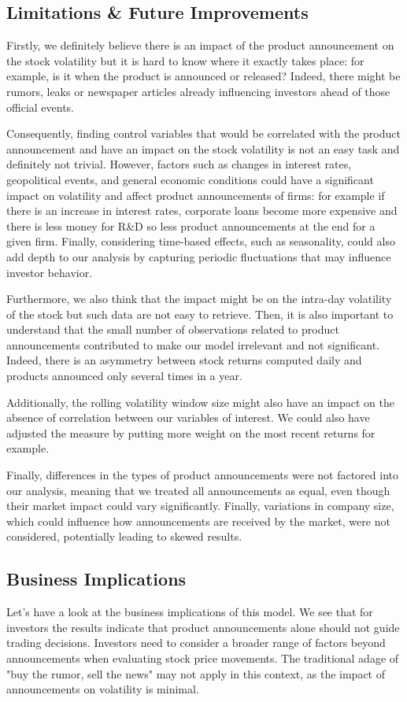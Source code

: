 \documentclass[12pt, oneside]{article}
\begin{document}
\subsection{Limitations \& Future Improvements}
Firstly, we definitely believe there is an impact of the product announcement on the stock volatility but it is hard to know where it exactly takes place: for example, is it when the product is announced or released? Indeed, there might be rumors, leaks or newspaper articles already influencing investors ahead of those official events.

Consequently, finding control variables that would be correlated with the product announcement and have an impact on the stock volatility is not an easy task and definitely not trivial. However, factors such as changes in interest rates, geopolitical events, and general economic conditions could have a significant impact on volatility and affect product announcements of firms: for example if there is an increase in interest rates, corporate loans become more expensive and there is less money for R\&D so less product announcements at the end for a given firm. Finally, considering time-based effects, such as seasonality, could also add depth to our analysis by capturing periodic fluctuations that may influence investor behavior.

Furthermore, we also think that the impact might be on the intra-day volatility of the stock but such data are not easy to retrieve. Then, it is also important to understand that the small number of observations related to product announcements contributed to make our model irrelevant and not significant. Indeed, there is an asymmetry between stock returns computed daily and products announced only several times in a year.

Additionally, the rolling volatility window size might also have an impact on the absence of correlation between our variables of interest. We could also have adjusted the measure by putting more weight on the most recent returns for example.

Finally, differences in the types of product announcements were not factored into our analysis, meaning that we treated all announcements as equal, even though their market impact could vary significantly. Finally, variations in company size, which could influence how announcements are received by the market, were not considered, potentially leading to skewed results.

\subsection{Business Implications}
Let's have a look at the business implications of this model. We see that for investors the results indicate that product announcements alone should not guide trading decisions. Investors need to consider a broader range of factors beyond announcements when evaluating stock price movements. The traditional adage of "buy the rumor, sell the news" may not apply in this context, as the impact of announcements on volatility is minimal.
\end{document}

